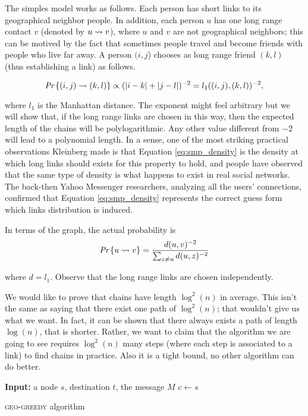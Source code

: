 The simples model works as follows. Each person has short links to its geographical neighbor people. In addition, each person $u$ has one long range contact $v$ (denoted by $u \rightsquigarrow v$), where $u$ and $v$ are not geographical neighbors; this can be motived by the fact that sometimes people travel and become friends with people who live far away. A person $(i, j$) chooses as long range friend $(k, l)$ (thus establishing a link) as follows.

\begin{equation}\label{eq:smp_density}
\emph{Pr}\left\{(i,j) \rightsquigarrow (k, l)\right\} \propto (|i-k| + |j-l|)^{-2} = l_1((i,j), (k,l))^{-2},   
\end{equation}

where $l_1$ is the Manhattan distance. The exponent might feel arbitrary but we will show that, if the long range links are chosen in this way, then the expected length of the chains will be polylogarithmic. Any other value different from $-2$ will lead to a polynomial length. In a sense, one of the most striking practical observations Kleinberg made is that Equation \ref{eq:smp_density} is the density at which long links should exists for this property to hold, and people have observed that the same type of density is what happens to exist in real social networks. The back-then Yahoo Messenger researchers, analyzing all the users' connections, confirmed that Equation \ref{eq:smp_density} represents the correct guess form which links distribution is induced. 

In terms of the graph, the actual probability is
\begin{equation}\label{problongrangelink}
\emph{Pr}\left\{u \rightsquigarrow v\right\} = \frac{d(u,v)^{-2}}{\sum_{z\neq u}d(u, z)^{-2}}
\end{equation}

where $d= l_1$. Observe that the long range links are chosen independently.

We would like to prove that chains have length $\log^2(n)$ in average. This isn't the same as saying that there exist one path of $\log^2(n)$; that wouldn't give us what we want. In fact, it can be shown that there always exists a path of length $\log(n)$, that is shorter. Rather, we want to claim that the algorithm we are going to see requires $\log^2(n)$ many steps (where each step is associated to a link)  to find chains in practice. Also it is a tight bound, no other algorithm can do better.

\begin{algorithm}
		\textbf{Input:} a node $s$, destination $t$, the message $M$\;
		$c \gets s$\;
		\caption{\textsc{geo-greedy} algorithm}
		\label{geogreedyalgo}
\end{algorithm}

